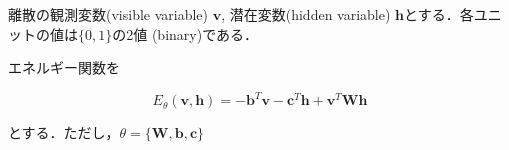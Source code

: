 離散の観測変数(visible variable) $\mathbf{v}$, 潜在変数(hidden variable) $\mathbf{h}$とする．各ユニットの値は$\{0, 1\}$の2値 (binary)である．

エネルギー関数を

$$
E_\theta(\mathbf{v}, \mathbf{h})=-\mathbf{b}^T \mathbf{v} - \mathbf{c}^T \mathbf{h} + \mathbf{v}^T \mathbf{W} \mathbf{h}
$$

とする．ただし，$\theta=\{\mathbf{W}, \mathbf{b}, \mathbf{c}\}$
